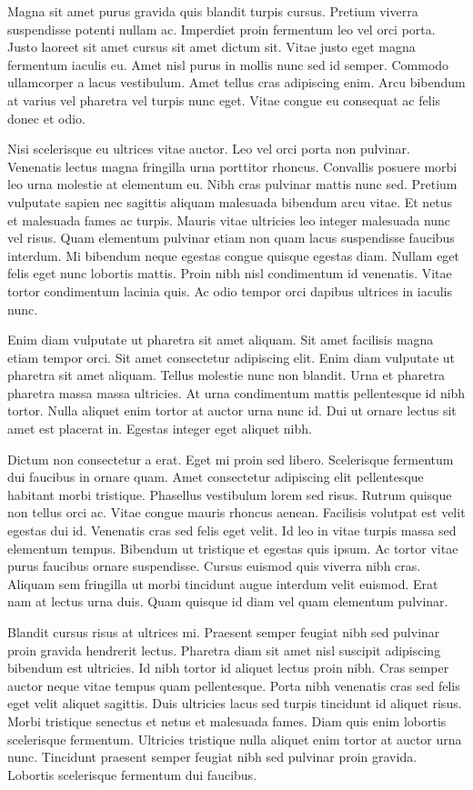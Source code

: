 \documentclass[12pt]{article}
\begin{document}
Magna sit amet purus gravida quis blandit turpis cursus. Pretium viverra suspendisse potenti nullam ac. Imperdiet proin fermentum leo vel orci porta. Justo laoreet sit amet cursus sit amet dictum sit. Vitae justo eget magna fermentum iaculis eu. Amet nisl purus in mollis nunc sed id semper. Commodo ullamcorper a lacus vestibulum. Amet tellus cras adipiscing enim. Arcu bibendum at varius vel pharetra vel turpis nunc eget. Vitae congue eu consequat ac felis donec et odio.

Nisi scelerisque eu ultrices vitae auctor. Leo vel orci porta non pulvinar. Venenatis lectus magna fringilla urna porttitor rhoncus. Convallis posuere morbi leo urna molestie at elementum eu. Nibh cras pulvinar mattis nunc sed. Pretium vulputate sapien nec sagittis aliquam malesuada bibendum arcu vitae. Et netus et malesuada fames ac turpis. Mauris vitae ultricies leo integer malesuada nunc vel risus. Quam elementum pulvinar etiam non quam lacus suspendisse faucibus interdum. Mi bibendum neque egestas congue quisque egestas diam. Nullam eget felis eget nunc lobortis mattis. Proin nibh nisl condimentum id venenatis. Vitae tortor condimentum lacinia quis. Ac odio tempor orci dapibus ultrices in iaculis nunc.

Enim diam vulputate ut pharetra sit amet aliquam. Sit amet facilisis magna etiam tempor orci. Sit amet consectetur adipiscing elit. Enim diam vulputate ut pharetra sit amet aliquam. Tellus molestie nunc non blandit. Urna et pharetra pharetra massa massa ultricies. At urna condimentum mattis pellentesque id nibh tortor. Nulla aliquet enim tortor at auctor urna nunc id. Dui ut ornare lectus sit amet est placerat in. Egestas integer eget aliquet nibh.

Dictum non consectetur a erat. Eget mi proin sed libero. Scelerisque fermentum dui faucibus in ornare quam. Amet consectetur adipiscing elit pellentesque habitant morbi tristique. Phasellus vestibulum lorem sed risus. Rutrum quisque non tellus orci ac. Vitae congue mauris rhoncus aenean. Facilisis volutpat est velit egestas dui id. Venenatis cras sed felis eget velit. Id leo in vitae turpis massa sed elementum tempus. Bibendum ut tristique et egestas quis ipsum. Ac tortor vitae purus faucibus ornare suspendisse. Cursus euismod quis viverra nibh cras. Aliquam sem fringilla ut morbi tincidunt augue interdum velit euismod. Erat nam at lectus urna duis. Quam quisque id diam vel quam elementum pulvinar.

Blandit cursus risus at ultrices mi. Praesent semper feugiat nibh sed pulvinar proin gravida hendrerit lectus. Pharetra diam sit amet nisl suscipit adipiscing bibendum est ultricies. Id nibh tortor id aliquet lectus proin nibh. Cras semper auctor neque vitae tempus quam pellentesque. Porta nibh venenatis cras sed felis eget velit aliquet sagittis. Duis ultricies lacus sed turpis tincidunt id aliquet risus. Morbi tristique senectus et netus et malesuada fames. Diam quis enim lobortis scelerisque fermentum. Ultricies tristique nulla aliquet enim tortor at auctor urna nunc. Tincidunt praesent semper feugiat nibh sed pulvinar proin gravida. Lobortis scelerisque fermentum dui faucibus.
\end{document}
